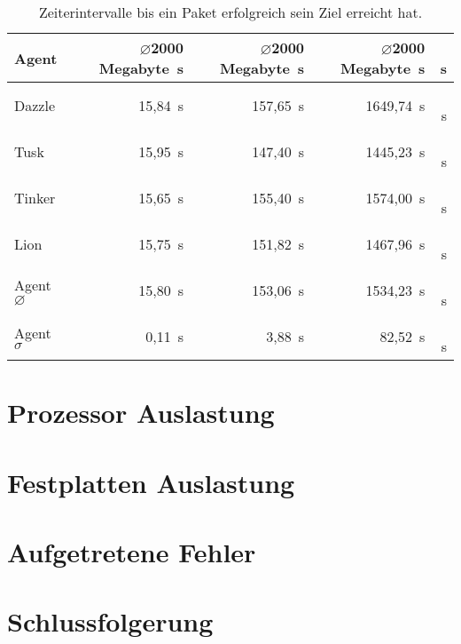 \begin{table}
\centering
\begin{tabular}{l%
 r<{\,s}%
 r<{\,s}%
 r<{\,s}%
 r<{\,s}%
}
Agent  				& $\diameter $2000 Megabyte		& $\diameter $2000 Megabyte		& $\diameter $2000 Megabyte		\\
\hline
Dazzle 				& 15,84			 		& 157,65				& 1649,74					\\
Tusk 				& 15,95					& 147,40				& 1445,23				\\
Tinker				& 15,65					& 155,40				& 1574,00				\\
Lion				& 15,75					& 151,82				& 1467,96				\\ 
Agent $\diameter $  		& 15,80					& 153,06			 	& 1534,23				\\   
Agent $\sigma $			& 0,11		 			& 3,88					& 82,52      				\\
\end{tabular}
\caption{Zeiterintervalle bis ein Paket erfolgreich sein Ziel erreicht hat.}
\label{tab:compZeiten}
\end{table}

























\section{Prozessor Auslastung}

\section{Festplatten Auslastung}

\section{Aufgetretene Fehler}

\section{Schlussfolgerung}
